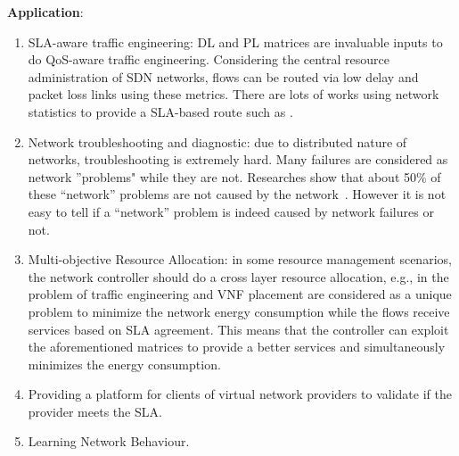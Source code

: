 \documentclass[10pt, journal, letterpaper]{IEEEtran}
\begin{document}
\noindent \textbf{Application}: 
\begin{enumerate}
    \item SLA-aware traffic engineering: DL and PL matrices are invaluable inputs to do QoS-aware traffic engineering. Considering the central resource administration of SDN networks, flows can be routed via low delay and packet loss links using these metrics. There are lots of works using network statistics to provide a SLA-based route such as \cite{tajiki2017optimal,kamoun2018ip,lin2018dte}. 
    \item Network troubleshooting and diagnostic: due to distributed nature of networks, troubleshooting is extremely hard. Many failures are considered as network ''problems" while they are not. Researches show that about 50$\%$ of these “network” problems are not caused by the network~\cite{guo2015pingmesh}. However it is not easy to tell if a “network” problem is indeed caused by network failures or not.
    \item Multi-objective Resource Allocation: in some resource management scenarios, the network controller should do a cross layer resource allocation, e.g., in \cite{tajiki2018energy} the problem of traffic engineering and VNF placement are considered as a unique problem to minimize the network energy consumption while the flows receive services based on SLA agreement. This means that the controller can exploit the aforementioned matrices to provide a better services and simultaneously minimizes the energy consumption.
    \item Providing a platform for clients of virtual network providers to validate if the provider meets the SLA.
    \item Learning Network Behaviour.
\end{enumerate}
\end{document}
